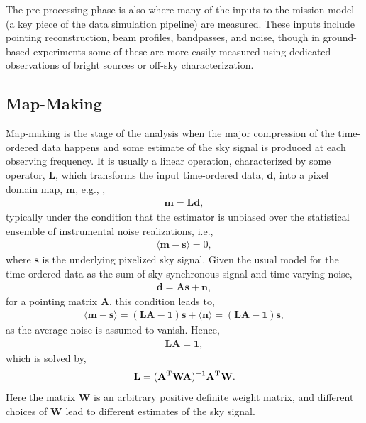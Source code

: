 The pre-processing phase is also where many of the inputs to the mission model (a key piece of the
data simulation pipeline) are measured. These inputs include pointing reconstruction, beam profiles, 
bandpasses, and noise, though in ground-based experiments some of these are more easily
measured using dedicated observations of bright sources or off-sky characterization.


\subsection{Map-Making}
\label{sec_mapmaking}

Map-making is the stage of the analysis when the major compression of the time-ordered data happens and some estimate of the sky signal is produced at each observing frequency. It is usually a linear operation, characterized by some operator, $\mathbf{L}$, which transforms the input time-ordered data, $\mathbf{d}$, into a pixel domain map, $\mathbf{m}$, 
e.g., \cite{Tegmark:1996qs},
\begin{eqnarray}
\mathbf{m} = \mathbf{L}\mathbf{d},
\end{eqnarray}
typically under the condition that the estimator is unbiased over the statistical ensemble of instrumental noise realizations, i.e.,
\begin{eqnarray}
\langle \mathbf{m} - \mathbf{s}\rangle = 0,
\label{eq:condMaps}
\end{eqnarray}
where $\mathbf{s}$ is the underlying pixelized sky signal. Given the usual model for the time-ordered data as the sum of sky-synchronous signal and time-varying noise, 
\begin{eqnarray}
\mathbf{d} = \mathbf{A}\mathbf{s} + \mathbf{n},
\end{eqnarray}
for a pointing matrix $\mathbf{A}$, this condition leads to,
\begin{eqnarray}
\langle \mathbf{m} - \mathbf{s}\rangle =  (\mathbf{L}\mathbf{A}-\mathbf{1})\mathbf{s} 
+ \langle \mathbf{n} \rangle = (\mathbf{L}\mathbf{A}-\mathbf{1})\mathbf{s},
\end{eqnarray}
as the average noise is assumed to vanish. Hence,
\begin{eqnarray}
\mathbf{L}\mathbf{A} = \mathbf{1},
\end{eqnarray}
which is solved by,
\begin{eqnarray}
\mathbf{L} = (\mathbf{A}^{\rm T} \mathbf{W} \mathbf{A})^{-1} \mathbf{A}^{\rm T} \mathbf{W}.
\end{eqnarray}
Here the matrix $\mathbf{W}$ is an arbitrary positive definite weight matrix, and different choices of $\mathbf{W}$ lead to different estimates of the sky signal.
